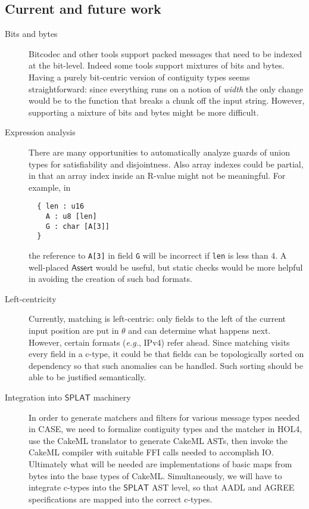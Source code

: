 \documentclass[svgnames]{llncs}
\newcommand{\eg}{\textit{e.g.}}
\newcommand{\konst}[1]{\ensuremath{\mathsf{#1}}}
\begin{document}
\subsection{Current and future work}

\begin{description}

\item [Bits and bytes] Bitcodec \cite{} and other tools support packed
  messages that need to be indexed at the bit-level. Indeed some tools
  support mixtures of bits and bytes. Having a purely bit-centric
  version of contiguity types seems straightforward: since everything
  runs on a notion of \emph{width} the only change would be to the
  function that breaks a chunk off the input string. However,
  supporting a mixture of bits and bytes might be more difficult.

\item [Expression analysis] There are many opportunities to
  automatically analyze guards of union types for satisfiability and
  disjointness. Also array indexes could be partial, in that an array
  index inside an R-value might not be meaningful. For example, in

\begin{verbatim}
  { len : u16
    A : u8 [len]
    G : char [A[3]]
  }
\end{verbatim}

the reference to \verb+A[3]+ in field \verb+G+ will be incorrect if
\verb+len+ is less than 4. A well-placed \konst{Assert} would be
useful, but static checks would be more helpful in avoiding the
creation of such bad formats.

\item [Left-centricity] Currently, matching is left-centric: only
  fields to the left of the current input position are put in $\theta$
  and can determine what happens next. However, certain formats (\eg,
  IPv4) refer ahead. Since matching visits every field in a c-type, it
  could be that fields can be topologically sorted on dependency so
  that such anomalies can be handled. Such sorting should be able to
  be justified semantically.

\item [Integration into \konst{SPLAT} machinery] In order to generate
  matchers and filters for various message types needed in CASE, we
  need to formalize contiguity types and the matcher in HOL4, use the
  CakeML translator to generate CakeML ASTs, then invoke the CakeML
  compiler with suitable FFI calls needed to accomplish IO. Ultimately
  what will be needed are implementations of basic maps from bytes
  into the base types of CakeML. Simultaneously, we will have to
  integrate c-types into the \konst{SPLAT} AST level, so that AADL and
  AGREE specifications are mapped into the correct c-types.

\end{description}
\end{document}
